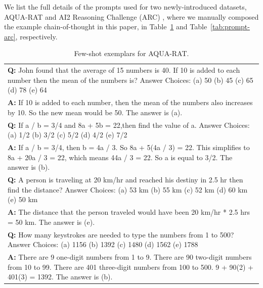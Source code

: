 We list the full details of the prompts used for two newly-introduced datasets, AQUA-RAT \citep{ling-etal-2017-program} and AI2 Reasoning Challenge (ARC) \citep{Clark2018ThinkYH}, where we manually composed the example chain-of-thought in this paper, in Table~\ref{tab:prompt-aqua} and Table~\ref{tab:prompt-arc}, respectively.

\begin{table}[h]
    \caption{
    Few-shot exemplars for AQUA-RAT.
    }
    \centering
    \small
    \begin{tabular}{p{13.5cm}}
        \toprule
        \textbf{Q:} John found that the average of 15 numbers is 40. If 10 is added to each number then the mean of the numbers is? Answer Choices: (a) 50 (b) 45 (c) 65 (d) 78 (e) 64\\
        \vspace{-1mm}
        \textbf{A:} If 10 is added to each number, then the mean of the numbers also increases by 10. So the new mean would be 50. The answer is (a). \\
        \vspace{0mm}
        \textbf{Q:} If a / b = 3/4 and 8a + 5b = 22,then find the value of a. Answer Choices: (a) 1/2 (b) 3/2 (c) 5/2 (d) 4/2 (e) 7/2\\
        \vspace{-1mm}
        \textbf{A:} If a / b = 3/4, then b = 4a / 3. So 8a + 5(4a / 3) = 22. This simplifies to 8a + 20a / 3 = 22, which means 44a / 3 = 22. So a is equal to 3/2. The answer is (b).\\
        \vspace{0mm}
        \textbf{Q:} A person is traveling at 20 km/hr and reached his destiny in 2.5 hr then find the distance? Answer Choices: (a) 53 km (b) 55 km (c) 52 km (d) 60 km (e) 50 km\\
        \vspace{-1mm}
        \textbf{A:} The distance that the person traveled would have been 20 km/hr * 2.5 hrs = 50 km. The answer is (e).\\
        \vspace{0mm}
        \textbf{Q:} How many keystrokes are needed to type the numbers from 1 to 500? Answer Choices: (a) 1156 (b) 1392 (c) 1480 (d) 1562 (e) 1788\\
        \vspace{-1mm}
        \textbf{A:} There are 9 one-digit numbers from 1 to 9. There are 90 two-digit numbers from 10 to 99. There are 401 three-digit numbers from 100 to 500. 9 + 90(2) + 401(3) = 1392. The answer is (b).\\
        \bottomrule
    \end{tabular}
    \label{tab:prompt-aqua}
\end{table}

